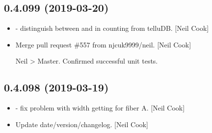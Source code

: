 \documentclass[a4paper,10pt,english]{report}
\begin{document}
\subsection{0.4.099 (2019-03-20)}
\label{\detokenize{misc/changelog:id160}}\begin{itemize}
\item {} 
 - distinguish between  and 
in counting from telluDB. {[}Neil Cook{]}

\item {} 
Merge pull request \#557 from njcuk9999/neil. {[}Neil Cook{]}

Neil \textendash{}\textgreater{} Master. Confirmed successful unit tests.

\end{itemize}


\subsection{0.4.098 (2019-03-19)}
\label{\detokenize{misc/changelog:id161}}\begin{itemize}
\item {} 
 - fix problem with width getting for fiber
A. {[}Neil Cook{]}

\item {} 
Update date/version/changelog. {[}Neil Cook{]}

\end{itemize}
\end{document}
